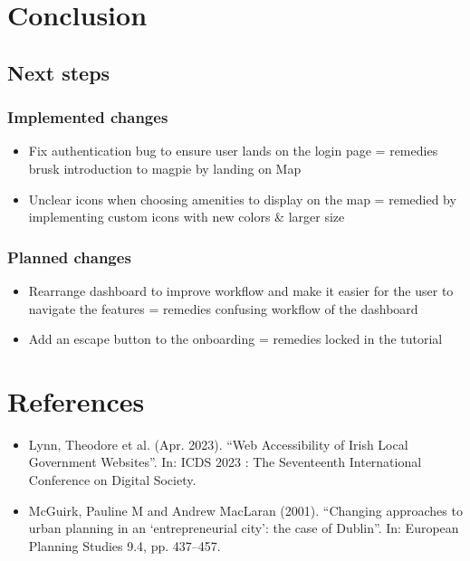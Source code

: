 \documentclass{report}
\begin{document}
\chapter{Conclusion}
\section{Next steps}
\subsection{Implemented changes}
\begin{itemize}
    \item Fix authentication bug to ensure user lands on the login page = remedies brusk introduction to magpie by landing on Map
    \item Unclear icons when choosing amenities to display on the map = remedied by implementing custom icons with new colors \& larger size
\end{itemize}
\subsection{Planned changes}
\begin{itemize}
    \item Rearrange dashboard to improve workflow and make it easier for the user to navigate the features = remedies confusing workflow of the dashboard
    \item Add an escape button to the onboarding = remedies locked in the tutorial
\end{itemize}


\newpage
{}
\chapter*{References}
\begin{itemize}
    \item Lynn, Theodore et al. (Apr. 2023). “Web Accessibility of Irish Local Government Websites”. In: ICDS 2023 : The
          Seventeenth International Conference on Digital Society.
    \item McGuirk, Pauline M and Andrew MacLaran (2001). “Changing approaches to urban planning in an ‘entrepreneurial
          city’: the case of Dublin”. In: European Planning Studies 9.4, pp. 437–457.
\end{itemize}
\listoffigures
\listoftables
\end{document}
